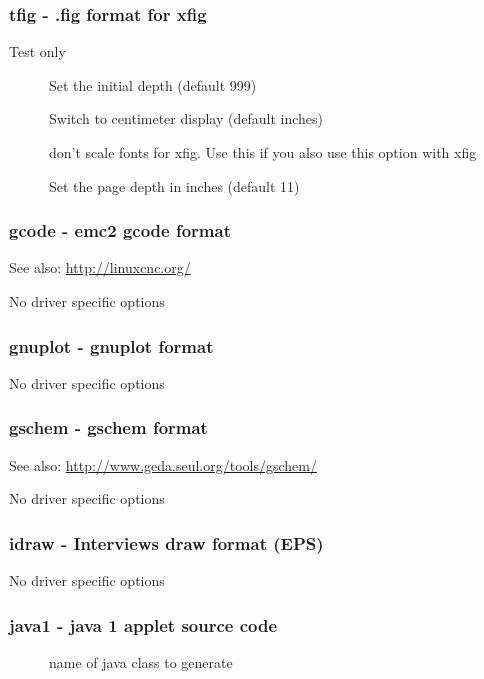 \documentclass[english,a4paper]{article}
\let\URL\url \let\Email\url \let\File\url
\begin{document}
\subsubsection{tfig - .fig format for xfig}
Test only

\begin{description}
\item[] 
Set the initial depth (default 999)


\item[] 
Switch to centimeter display (default inches)


\item[] 
don't scale fonts for xfig. Use this if you also use this option with xfig


\item[] 
Set the page depth in inches (default 11)


\end{description}
\subsubsection{gcode - emc2 gcode format}
See also:  \URL{http://linuxcnc.org/} 

No driver specific options
\subsubsection{gnuplot - gnuplot format}
No driver specific options
\subsubsection{gschem - gschem format}
See also:  \URL{http://www.geda.seul.org/tools/gschem/} 

No driver specific options
\subsubsection{idraw - Interviews draw format (EPS)}
No driver specific options
\subsubsection{java1 - java 1 applet source code}
\begin{description}
\item[] 
name of java class to generate


\end{description}
\end{document}
